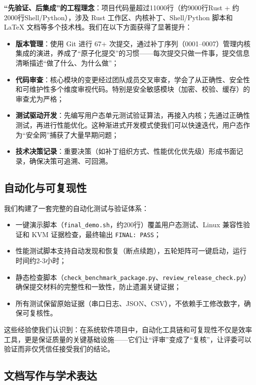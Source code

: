 \textbf{“先验证、后集成”的工程理念}：项目代码量超过11000行（约9000行Rust + 约2000行Shell/Python），涉及 Rust 工作区、内核补丁、Shell/Python 脚本和 LaTeX 文档等多个技术栈。我们在以下方面获得了显著提升：

\begin{itemize}
    \item \textbf{版本管理}：使用 Git 进行 67+ 次提交，通过补丁序列（0001--0007）管理内核集成的演进，养成了“原子化提交”的习惯——每次提交只做一件事，提交信息清晰描述“做了什么、为什么做”；
    \item \textbf{代码审查}：核心模块的变更经过团队成员交叉审查，学会了从正确性、安全性和可维护性多个维度审视代码。特别是安全敏感模块（加密、校验、缓存）的审查尤为严格；
    \item \textbf{测试驱动开发}：先编写用户态单元测试验证算法，再接入内核；先通过正确性测试，再进行性能优化。这种渐进式开发模式使我们可以快速迭代，用户态作为“安全网”捕获了大量早期问题；
    \item \textbf{技术决策记录}：重要决策（如补丁组织方式、性能优化优先级）形成书面记录，确保决策可追溯、可回溯。
\end{itemize}

\subsection{自动化与可复现性}

我们构建了一套完整的自动化测试与验证体系：

\begin{itemize}
    \item 一键演示脚本（\texttt{final\_demo.sh}，约200行）覆盖用户态测试、Linux 兼容性验证和 KVM 证据检查，最终输出 \texttt{FINAL: PASS}；
    \item 性能测试脚本支持自动发现和恢复（断点续跑），五轮矩阵可一键启动，运行时间约2-3小时；
    \item 静态检查脚本（\texttt{check\_benchmark\_package.py}、\texttt{review\_release\_check.py}）确保提交材料的完整性和一致性，防止遗漏关键证据；
    \item 所有测试保留原始证据（串口日志、JSON、CSV），不依赖手工修改数字，确保可复核性。
\end{itemize}

这些经验使我们认识到：在系统软件项目中，自动化工具链和可复现性不仅是效率工具，更是保证质量的关键基础设施——它们让“评审”变成了“复核”，让评委可以验证而非仅凭信任接受我们的结论。

\subsection{文档写作与学术表达}

